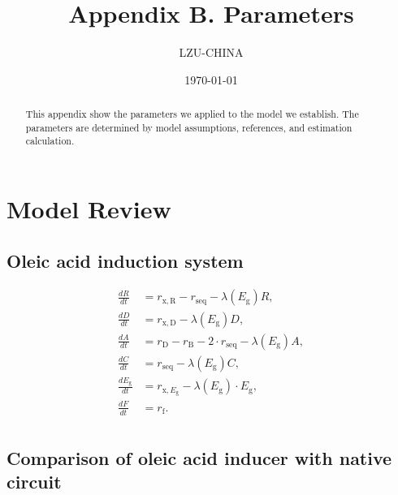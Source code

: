 \documentclass[UTF8]{article}
\title{Appendix B. Parameters}
\author{LZU-CHINA}
\date{\today}
\begin{document}
    \maketitle
    \begin{abstract}
       This appendix show the parameters we applied to the model we establish. The parameters are determined by model assumptions, references, and estimation calculation.
       
    \end{abstract}

\section{Model Review}

\subsection{Oleic acid induction system}

\begin{equation}
	\begin{aligned}
		\frac{d R}{d t} & =r_{\mathrm{x}, \mathrm{R}}-r_{\mathrm{seq}}-\lambda\left(E_{\mathrm{g}}\right) R, \\
		\frac{d D}{d t} & =r_{\mathrm{x}, \mathrm{D}}-\lambda\left(E_{\mathrm{g}}\right) D, \\
		\frac{d A}{d t} & =r_{\mathrm{D}}-r_{\mathrm{B}}-2 \cdot r_{\mathrm{seq}}-\lambda\left(E_{\mathrm{g}}\right) A, \\
		\frac{d C}{d t} & =r_{\mathrm{seq}}-\lambda\left(E_{\mathrm{g}}\right) C, \\
		\frac{d E_{\mathrm{g}}}{d t} & =r_{\mathrm{x}, E_{\mathrm{g}}}-\lambda\left(E_{\mathrm{g}}\right) \cdot E_{\mathrm{g}}, \\
		\frac{d F}{d t} & =r_{\mathrm{f}}.  \\
	\end{aligned}
\end{equation}

\subsection{Comparison of oleic acid inducer with native circuit}
\end{document}
